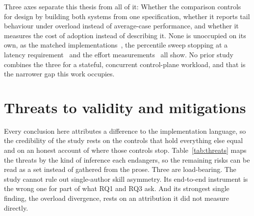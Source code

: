 \documentclass[english,oneside,a4paper,censored,csm,software-track-2020]{HYthesisML}
\begin{document}
\begin{appendices}
Three axes separate this thesis from all of it: Whether the comparison controls for design by
building both systems from one specification, whether it reports tail behaviour under overload
instead of average-case performance, and whether it measures the cost of adoption instead of
describing it. None is unoccupied on its own, as the matched
implementations~\cite{emmerich2019drivers,li2021ipc,narayanan2020redleaf,suchert2023stamp,gonzalez2023rustudp,pirelli2023safelowlevel,emberg2023asn1},
the percentile sweep stopping at a latency requirement~\cite{arvidsson2025async} and the effort
measurements~\cite{karlback2021ran,fulton2021adopting} all show. No prior study combines the
three for a stateful, concurrent control-plane workload, and that is the narrower gap this work
occupies.


\section{Threats to validity and mitigations}\label{sec:threats}
Every conclusion here attributes a difference to the implementation language, so the credibility
of the study rests on the controls that hold everything else equal and on an honest account of
where those controls stop. Table~\ref{tab:threats} maps the threats by the kind of inference each
endangers, so the remaining risks can be read as a set instead of gathered from the prose. Three
are load-bearing. The study cannot rule out single-author skill asymmetry. Its end-to-end
instrument is the wrong one for part of what RQ1 and RQ3 ask. And its strongest single finding,
the overload divergence, rests on an attribution it did not measure directly.


\end{appendices}
\end{document}
